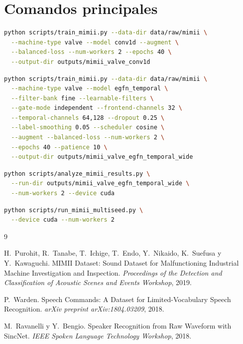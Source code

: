 \documentclass[11pt,a4paper]{article}
\begin{document}
\appendix
\section{Comandos principales}

\begin{lstlisting}[language=bash,caption={Entrenamiento del baseline industrial.}]
python scripts/train_mimii.py --data-dir data/raw/mimii \
  --machine-type valve --model conv1d --augment \
  --balanced-loss --num-workers 2 --epochs 40 \
  --output-dir outputs/mimii_valve_conv1d
\end{lstlisting}

\begin{lstlisting}[language=bash,caption={Entrenamiento de EGFN temporal wide.}]
python scripts/train_mimii.py --data-dir data/raw/mimii \
  --machine-type valve --model egfn_temporal \
  --filter-bank fine --learnable-filters \
  --gate-mode independent --frontend-channels 32 \
  --temporal-channels 64,128 --dropout 0.25 \
  --label-smoothing 0.05 --scheduler cosine \
  --augment --balanced-loss --num-workers 2 \
  --epochs 40 --patience 10 \
  --output-dir outputs/mimii_valve_egfn_temporal_wide
\end{lstlisting}

\begin{lstlisting}[language=bash,caption={Calibración e interpretabilidad.}]
python scripts/analyze_mimii_results.py \
  --run-dir outputs/mimii_valve_egfn_temporal_wide \
  --num-workers 2 --device cuda
\end{lstlisting}

\begin{lstlisting}[language=bash,caption={Experimento multisemilla reproducible.}]
python scripts/run_mimii_multiseed.py \
  --device cuda --num-workers 2
\end{lstlisting}

\begin{thebibliography}{9}

H.~Purohit, R.~Tanabe, T.~Ichige, T.~Endo, Y.~Nikaido, K.~Suefusa y Y.~Kawaguchi.
\newblock MIMII Dataset: Sound Dataset for Malfunctioning Industrial Machine Investigation and Inspection.
\newblock \emph{Proceedings of the Detection and Classification of Acoustic Scenes and Events Workshop}, 2019.

P.~Warden.
\newblock Speech Commands: A Dataset for Limited-Vocabulary Speech Recognition.
\newblock \emph{arXiv preprint arXiv:1804.03209}, 2018.

M.~Ravanelli y Y.~Bengio.
\newblock Speaker Recognition from Raw Waveform with SincNet.
\newblock \emph{IEEE Spoken Language Technology Workshop}, 2018.

\end{thebibliography}
\end{document}
